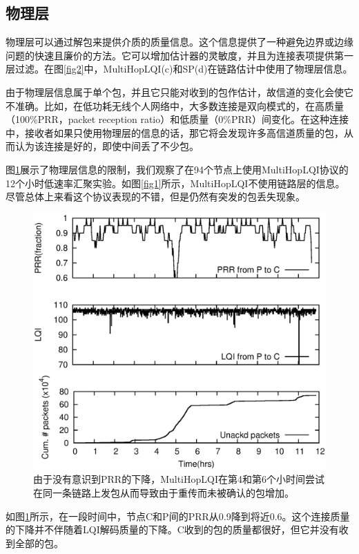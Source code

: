 \documentclass[12pt,a4paper]{article}
\begin{document}
\subsection{物理层}
物理层可以通过解包来提供介质的质量信息。这个信息提供了一种避免边界或边缘问题的快速且廉价的方法。它可以增加估计器的灵敏度，并且为连接表项提供第一层过滤。在图\ref{fig2}中，MultiHopLQI(c)和SP(d)在链路估计中使用了物理层信息。

由于物理层信息属于单个包，并且它只能对收到的包作估计，故信道的变化会使它不准确。比如，在低功耗无线个人网络中，大多数连接是双向模式的，在高质量（100\%PRR，packet reception ratio）和低质量（0\%PRR）间变化。在这种连接中，接收者如果只使用物理层的信息的话，那它将会发现许多高信道质量的包，从而认为该连接是好的，即使中间丢了不少包。

图\ref{fig3}展示了物理层信息的限制，我们观察了在94个节点上使用MultiHopLQI协议的12个小时低速率汇聚实验。如图\ref{fig1}所示，MultiHopLQI不使用链路层的信息。尽管总体上来看这个协议表现的不错，但是仍然有突发的包丢失现象。

\begin{figure}[ht]
\centering
\includegraphics[scale=0.5]{figures/fig3}
\caption{由于没有意识到PRR的下降，MultiHopLQI在第4和第6个小时间尝试在同一条链路上发包从而导致由于重传而未被确认的包增加。}\label{fig3}
\end{figure}

如图\ref{fig3}所示，在一段时间中，节点C和P间的PRR从0.9降到将近0.6。这个连接质量的下降并不伴随着LQI解码质量的下降。C收到的包的质量都很好，但它并没有收到全部的包。
\end{document}
